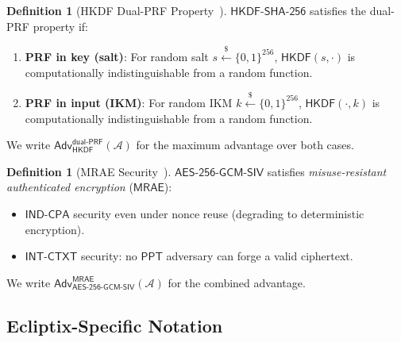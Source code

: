 \documentclass[11pt,a4paper]{article}
\theoremstyle{definition}
\newtheorem{definition}[theorem]{Definition}
\theoremstyle{remark}
\newcommand{\ppt}{\mathsf{PPT}}
\newcommand{\adv}{\mathsf{Adv}}
\newcommand{\advA}{\mathcal{A}}
\newcommand{\HKDF}{\mathsf{HKDF}}
\newcommand{\SHA}{\mathsf{SHA\text{-}256}}
\newcommand{\AEAD}{\mathsf{AES\text{-}256\text{-}GCM\text{-}SIV}}
\newcommand{\INDCPA}{\mathsf{IND\text{-}CPA}}
\newcommand{\INTCTXT}{\mathsf{INT\text{-}CTXT}}
\newcommand{\MRAE}{\mathsf{MRAE}}
\newcommand{\dualPRF}{\mathsf{dual\text{-}PRF}}
\newcommand{\getsr}{\xleftarrow{\$}}
\newcommand{\bits}{\{0,1\}}
\begin{document}
\begin{definition}[HKDF Dual-PRF Property~\cite{krawczyk2010}]
\label{def:dualprf}
$\HKDF\text{-}\SHA$ satisfies the dual-PRF property if:
\begin{enumerate}[nosep]
  \item \textbf{PRF in key (salt)}: For random salt $s \getsr \bits^{256}$,
        $\HKDF(s, \cdot)$ is computationally indistinguishable from a random function.
  \item \textbf{PRF in input (IKM)}: For random IKM $k \getsr \bits^{256}$,
        $\HKDF(\cdot, k)$ is computationally indistinguishable from a random function.
\end{enumerate}
We write $\adv^{\dualPRF}_{\HKDF}(\advA)$ for the maximum advantage over
both cases.
\end{definition}

\begin{definition}[MRAE Security~\cite{rfc8452}]
\label{def:mrae}
$\AEAD$ satisfies \emph{misuse-resistant authenticated encryption} ($\MRAE$):
\begin{itemize}[nosep]
  \item $\INDCPA$ security even under nonce reuse (degrading to deterministic encryption).
  \item $\INTCTXT$ security: no $\ppt$ adversary can forge a valid ciphertext.
\end{itemize}
We write $\adv^{\MRAE}_{\AEAD}(\advA)$ for the combined advantage.
\end{definition}

\subsection{Ecliptix-Specific Notation}
\label{subsec:epp-notation}
\end{document}
